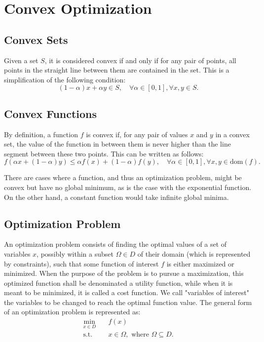 \label{chap:LiteratureReview}

\section{Convex Optimization}

    \subsection{Convex Sets}
        Given a set $S$, it is considered convex if and only if for any pair of points, all points in the straight line between them are contained in the set.
        This is a simplification of the following condition:
        \begin{equation}
            ( 1 - \alpha)x + \alpha y \in S, \quad \forall \alpha \in [0, 1], \forall {x,y} \in S.
        \end{equation}


    \subsection{Convex Functions}
        By definition, a function $f$ is convex if, for any pair of values $x$ and $y$ in a convex set, the value of the function in between them is never higher than the line segment between these two points. This can be written as follows:
        \begin{equation}
            f(\alpha x + (1-\alpha) y) \le \alpha f( x) + (1-\alpha) f(y), \quad \forall \alpha \in [0, 1], \forall {x,y} \in \text{dom}(f).
        \end{equation}

        There are cases where a function, and thus an optimization problem, might be convex but have no global minimum, as is the case with the exponential function. On the other hand, a constant function would take infinite global minima. 

    \subsection{Optimization Problem}
        An optimization problem consists of finding the optimal values of a set of variables $x$, possibly within a subset $\Omega\in D$ of their domain (which is represented by constraints), such that some function of interest $f$ is either maximized or minimized. When the purpose of the problem is to pursue a maximization, this optimized function shall be denominated a utility function, while when it is meant to be minimized, it is called a cost function. We call "variables of interest" the variables to be changed to reach the optimal function value. The general form of an optimization problem is represented as:
        \begin{align}
            \min_{x\in D} \quad & f(x)\\
            \textrm{s.t.} \quad 
                & x\in\Omega, \text{ where }\Omega\subseteq D.
        \end{align}


